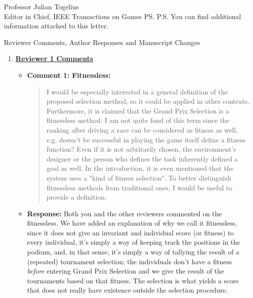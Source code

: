 \documentclass[10pt]{letter} %
\begin{document}
\begin{letter}{Professor Julian Togelius \\ Editor in Chief, IEEE Transactions on Games}
\ps{P.S. You can find additional information attached to this letter.} %







\newpage

Reviewer Comments, Author Responses and Manuscript Changes
\begin{enumerate}
\item {\bf \underline{ Reviewer 1 Comments}}\\
	\begin{itemize}
		\item {\bf Comment 1: Fitnessless:
		\begin{quote}
			I would be especially interested in a general definition of the
			proposed selection method, so it could be applied in other
			contexts. Furthermore, it is claimed that the Grand Prix Selection is
			a fitnessless method. I am not quite fond of this term since the
			ranking after driving a race can be considered as fitness as well,
			e.g. doesn't be successful in playing the game itself define a fitness
			function? Even if it is not arbritarily chosen, the environment's
			designer or the person who defines the task inherently defined a goal
			as well. In the introduction, it is even mentioned that the system
			uses a "kind of fitness selection". To better distinguish fitnessless
			methods from traditional ones, I would be useful to provide a
			definition.
		\end{quote}
	}
		\item {\bf Response:} 
		Both you and the other reviewers commented on the fitnessless. 
		We have added an explanation of why we call it fitnessless, since it
		does not give an invariant and individual score (or fitness) to every
		individual, it's simply a way of keeping track the positions in the
		podium, and, in that sense, it's simply a way of tallying the result
		of a (repeated) tournament selection; the individuals don't have a
		fitness {\em before} entering Grand Prix Selection and we give the
		result of the tournaments based on that fitness. The selection is what
		yields a score that does not really have existence outside the
		selection procedure.
		

\end{itemize}
\end{enumerate}
\end{letter}
\end{document}
